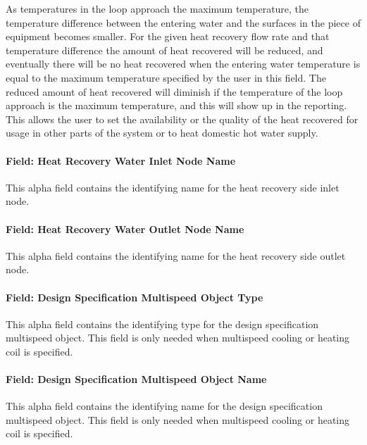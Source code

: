 As temperatures in the loop approach the maximum temperature, the temperature difference between the entering water and the surfaces in the piece of equipment becomes smaller. For the given heat recovery flow rate and that temperature difference the amount of heat recovered will be reduced, and eventually there will be no heat recovered when the entering water temperature is equal to the maximum temperature specified by the user in this field. The reduced amount of heat recovered will diminish if the temperature of the loop approach is the maximum temperature, and this will show up in the reporting. This allows the user to set the availability or the quality of the heat recovered for usage in other parts of the system or to heat domestic hot water supply.

\paragraph{Field: Heat Recovery Water Inlet Node Name}\label{field-heat-recovery-water-inlet-node-name-000}

This alpha field contains the identifying name for the heat recovery side inlet node.

\paragraph{Field: Heat Recovery Water Outlet Node Name}\label{field-heat-recovery-water-outlet-node-name-000}

This alpha field contains the identifying name for the heat recovery side outlet node.

\paragraph{Field: Design Specification Multispeed Object Type}\label{field-design-specification-multispeed-object-type}

This alpha field contains the identifying type for the design specification multispeed object. This field is only needed when multispeed cooling or heating coil is specified.

\paragraph{Field: Design Specification Multispeed Object Name}\label{field-design-specification-multispeed-object-name}

This alpha field contains the identifying name for the design specification multispeed object. This field is only needed when multispeed cooling or heating coil is specified.

